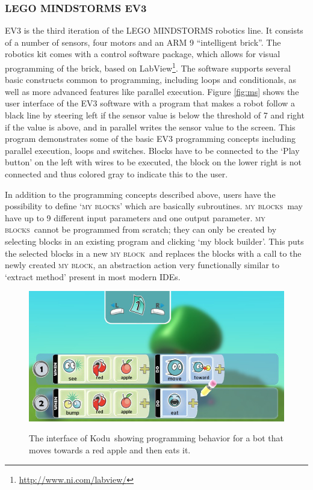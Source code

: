 \documentclass[conference]{IEEEtran}
\newcommand{\ms}{LEGO MINDSTORMS EV3}
\newcommand{\mbs}{\textsc{my blocks}}
\newcommand{\mb}{\textsc{my block}}
\begin{document}
\subsubsection{\ms}
\label{sec:lego}
EV3 is the third iteration of the LEGO MINDSTORMS robotics line. It consists of a number of sensors, four motors and an ARM 9 ``intelligent brick''. The robotics kit comes with a control software package, which allows for visual programming of the brick, based on LabView\footnote{\url{http://www.ni.com/labview/}}. The software supports several basic constructs common to programming, including loops and conditionals, as well as more advanced features like parallel execution. Figure \ref{fig:ms} shows the user interface of the EV3 software with a program that makes a robot follow a black line by steering left if the sensor value is below the threshold of 7 and right if the value is above, and in parallel writes the sensor value to the screen. This program demonstrates some of the basic EV3 programming concepts including parallel execution, loops and switches. Blocks have to be connected to the `Play button' on the left with wires to be executed, the block on the lower right is not connected and thus colored gray to indicate this to the user.

In addition to the programming concepts described above, users have the possibility to define `\mbs' which are basically  subroutines. \mbs~may have up to 9 different input parameters and one output parameter. \mbs~cannot be programmed from scratch; they can only be created by selecting blocks in an existing program and clicking `my block builder'. This puts the selected blocks in a new \mb~and replaces the blocks with a call to the newly created \mb, an abstraction action very functionally similar to `extract method' present in most modern IDEs. 


\begin{figure}[tb]
\caption{The interface of Kodu~showing programming behavior for a bot that moves towards a red apple and then eats it.}
\centering
\includegraphics[width=\columnwidth]{img/programmingui.png}
\label{fig:Kodu}
\end{figure}
\end{document}
